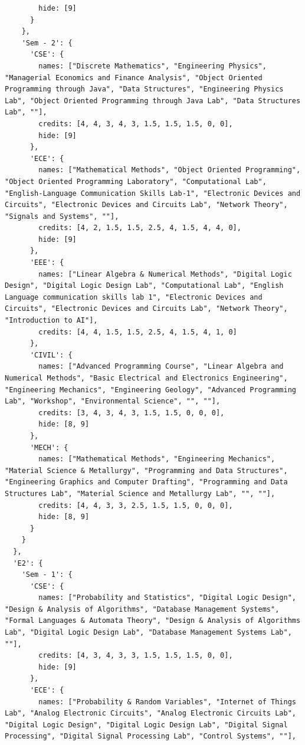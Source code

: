 \documentclass[11pt,a4paper,oneside]{article}
\begin{document}
\begin{lstlisting}
        hide: [9]
      }
    },
    'Sem - 2': {
      'CSE': {
        names: ["Discrete Mathematics", "Engineering Physics", "Managerial Economics and Finance Analysis", "Object Oriented Programming through Java", "Data Structures", "Engineering Physics Lab", "Object Oriented Programming through Java Lab", "Data Structures Lab", ""],
        credits: [4, 4, 3, 4, 3, 1.5, 1.5, 1.5, 0, 0],
        hide: [9]
      },
      'ECE': {
        names: ["Mathematical Methods", "Object Oriented Programming", "Object Oriented Programming Laboratory", "Computational Lab", "English-Language Communication Skills Lab-1", "Electronic Devices and Circuits", "Electronic Devices and Circuits Lab", "Network Theory", "Signals and Systems", ""],
        credits: [4, 2, 1.5, 1.5, 2.5, 4, 1.5, 4, 4, 0],
        hide: [9]
      },
      'EEE': {
        names: ["Linear Algebra & Numerical Methods", "Digital Logic Design", "Digital Logic Design Lab", "Computational Lab", "English Language communication skills lab 1", "Electronic Devices and Circuits", "Electronic Devices and Circuits Lab", "Network Theory", "Introduction to AI"],
        credits: [4, 4, 1.5, 1.5, 2.5, 4, 1.5, 4, 1, 0]
      },
      'CIVIL': {
        names: ["Advanced Programming Course", "Linear Algebra and Numerical Methods", "Basic Electrical and Electronics Engineering", "Engineering Mechanics", "Engineering Geology", "Advanced Programming Lab", "Workshop", "Environmental Science", "", ""],
        credits: [3, 4, 3, 4, 3, 1.5, 1.5, 0, 0, 0],
        hide: [8, 9]
      },
      'MECH': {
        names: ["Mathematical Methods", "Engineering Mechanics", "Material Science & Metallurgy", "Programming and Data Structures", "Engineering Graphics and Computer Drafting", "Programming and Data Structures Lab", "Material Science and Metallurgy Lab", "", ""],
        credits: [4, 4, 3, 3, 2.5, 1.5, 1.5, 0, 0, 0],
        hide: [8, 9]
      }
    }
  },
  'E2': {
    'Sem - 1': {
      'CSE': {
        names: ["Probability and Statistics", "Digital Logic Design", "Design & Analysis of Algorithms", "Database Management Systems", "Formal Languages & Automata Theory", "Design & Analysis of Algorithms Lab", "Digital Logic Design Lab", "Database Management Systems Lab", ""],
        credits: [4, 3, 4, 3, 3, 1.5, 1.5, 1.5, 0, 0],
        hide: [9]
      },
      'ECE': {
        names: ["Probability & Random Variables", "Internet of Things Lab", "Analog Electronic Circuits", "Analog Electronic Circuits Lab", "Digital Logic Design", "Digital Logic Design Lab", "Digital Signal Processing", "Digital Signal Processing Lab", "Control Systems", ""],

\end{lstlisting}
\end{document}
